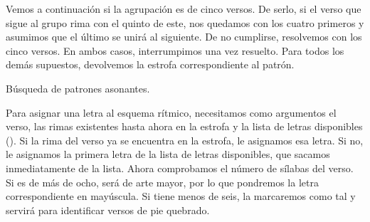 Vemos a continuación si la agrupación es de cinco versos.  De serlo, si el verso que sigue al grupo rima con el quinto de este, nos quedamos con los cuatro primeros y asumimos que el último se unirá al siguiente. De no cumplirse, resolvemos con los cinco versos. En ambos casos, interrumpimos una vez resuelto. Para todos los demás supuestos, devolvemos la estrofa correspondiente al patrón.

\begin{algorithm}[!ht]
	\caption{Búsqueda de patrones asonantes.}\label{list:stanzases5}
\end{algorithm}

Para asignar una letra al esquema rítmico, necesitamos como argumentos  el verso, las rimas existentes hasta ahora en la estrofa y la lista de letras disponibles ().  Si la rima del verso ya se encuentra en la estrofa, le asignamos esa letra. Si no, le asignamos la primera letra de la lista de letras disponibles, que sacamos inmediatamente de la lista. Ahora comprobamos el número de sílabas del verso. Si es de más de ocho, será de arte mayor, por lo que pondremos la letra correspondiente en mayúscula. Si tiene menos de seis, la marcaremos como tal y servirá para identificar versos de pie quebrado.


